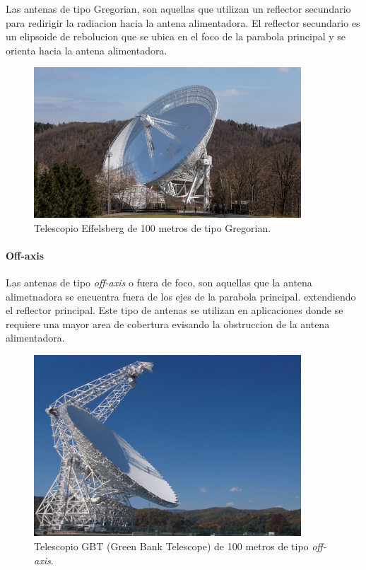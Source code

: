 Las antenas de tipo Gregorian, son aquellas que utilizan un reflector secundario para redirigir la radiacion hacia la antena alimentadora. El reflector secundario es un elipsoide de rebolucion que se ubica en el foco de la parabola principal y se orienta hacia la antena alimentadora.

\begin{figure}
    \centering
    \includegraphics[width = 10cm]{img/gregorian.jpg}
    \caption{Telescopio Effelsberg de 100 metros de tipo Gregorian.}
    \label{fig:greg}
\end{figure}

\paragraph{Off-axis}

Las antenas de tipo \textit{off-axis} o fuera de foco, son aquellas que la antena alimetnadora se encuentra fuera de los ejes de la parabola principal. extendiendo el reflector principal. Este tipo de antenas se utilizan en aplicaciones donde se requiere una mayor area de cobertura evisando la obstruccion de la antena alimentadora.

\begin{figure}
    \centering
    \includegraphics[width = 10cm]{img/off-axis.jpg}
    \caption{Telescopio GBT (Green Bank Telescope) de 100 metros de tipo \textit{off-axis}.}
    \label{fig:off}
\end{figure}


